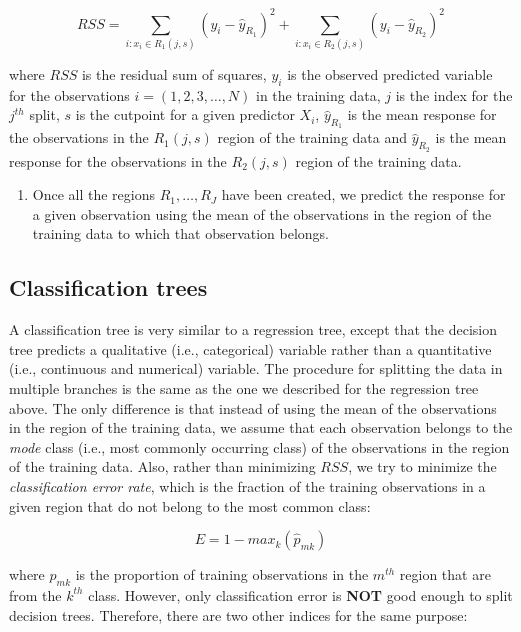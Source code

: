 \documentclass[]{book}
\providecommand{\tightlist}{%
  \setlength{\itemsep}{0pt}\setlength{\parskip}{0pt}}
\begin{document}
\[
RSS=\sum_{i: x_i \in R_1(j,s)}(y_i-\hat{y}_{R_1})^2 + \sum_{i: x_i \in R_2(j,s)}(y_i-\hat{y}_{R_2})^2
\]

where \(RSS\) is the residual sum of squares, \(y_i\) is the observed predicted variable for the observations \(i=(1,2,3, \dots, N)\) in the training data, \(j\) is the index for the \(j^{th}\) split, \(s\) is the cutpoint for a given predictor \(X_i\), \(\hat{y}_{R_1}\) is the mean response for the observations in the \(R_1(j,s)\) region of the training data and \(\hat{y}_{R_2}\) is the mean response for the observations in the \(R_2(j,s)\) region of the training data.

\begin{enumerate}
\def\labelenumi{\arabic{enumi}.}
\setcounter{enumi}{1}
\tightlist
\item
  Once all the regions \(R_1, \dots, R_J\) have been created, we predict the response for a given observation using the mean of the observations in the region of the training data to which that observation belongs.
\end{enumerate}

\hypertarget{classification-trees}{%
\subsection{Classification trees}\label{classification-trees}}

A classification tree is very similar to a regression tree, except that the decision tree predicts a qualitative (i.e., categorical) variable rather than a quantitative (i.e., continuous and numerical) variable. The procedure for splitting the data in multiple branches is the same as the one we described for the regression tree above. The only difference is that instead of using the mean of the observations in the region of the training data, we assume that each observation belongs to the \emph{mode} class (i.e., most commonly occurring class) of the observations in the region of the training data. Also, rather than minimizing \(RSS\), we try to minimize the \emph{classification error rate}, which is the fraction of the training observations in a given region that do not belong to the most common class:

\[
E = 1 - max_k(\hat{p}_{mk})
\]

where \(\hat{p}_{mk}\) is the proportion of training observations in the \(m^{th}\) region that are from the \(k^{th}\) class. However, only classification error is \textbf{NOT} good enough to split decision trees. Therefore, there are two other indices for the same purpose:
\end{document}
